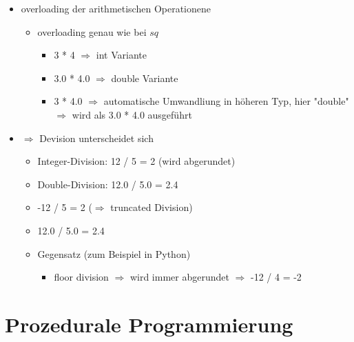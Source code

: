\documentclass[a4paper]{scrartcl}
\begin{document}
\begin{itemize}
\begin{itemize}
\begin{itemize}
\begin{itemize}
\begin{verbatim}
#include <iostream>
#include <string>
int main() {
	std::cout << "Hello, world!" << std::endl;
	std::string out = "mein erstes Programm\n";
	std::cout << out;
	return 0;
}
\end{verbatim}
\end{itemize}
\end{itemize}
\item overloading der arithmetischen Operationene
\begin{itemize}
\item overloading genau wie bei $sq$
\begin{itemize}
\item 3 * 4 $\Rightarrow$ int Variante
\item 3.0 * 4.0 $\Rightarrow$ double Variante
\item 3 * 4.0 $\Rightarrow$ automatische Umwandliung in höheren Typ, hier "double" $\Rightarrow$ wird als 3.0 * 4.0 ausgeführt
\end{itemize}
\end{itemize}
\item $\Rightarrow$ Devision unterscheidet sich
\begin{itemize}
\item Integer-Division: 12 / 5 = 2 (wird abgerundet)
\item Double-Division: 12.0 / 5.0 = 2.4
\item -12 / 5 = 2 ($\Rightarrow$ truncated Division)
\item 12.0 / 5.0 = 2.4
\item Gegensatz (zum Beispiel in Python)
\begin{itemize}
\item floor division $\Rightarrow$ wird immer abgerundet $\Rightarrow$ -12 / 4 = -2
\end{itemize}
\end{itemize}
\end{itemize}
\end{itemize}
\section{Prozedurale Programmierung}
\label{sec-9}
\end{document}
